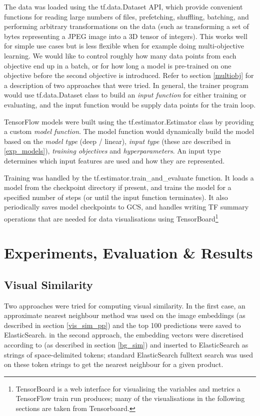 The data was loaded using the tf.data.Dataset API, which provide convenient functions for reading large numbers of files, prefetching, shuffling, batching, and performing arbitrary transformations on the data (such as transforming a set of bytes representing a JPEG image into a 3D tensor of integers).
This works well for simple use cases but is less flexible when for example doing multi-objective learning.
We would like to control roughly how many data points from each objective end up in a batch, or for how long a model is pre-trained on one objective before the second objective is introduced.
Refer to section \ref{multiobj} for a description of two approaches that were tried.
In general, the trainer program would use tf.data.Dataset class to build an \textit{input function} for either training or evaluating, and the input function would be supply data points for the train loop.

TensorFlow models were built using the tf.estimator.Estimator class by providing a custom \textit{model function}.
The model function would dynamically build the model based on the \textit{model type} (deep / linear), \textit{input type} (these are described in \ref{exp_models}), \textit{training objectives} and \textit{hyperparameters}.
An input type determines which input features are used and how they are represented.

Training was handled by the tf.estimator.train\_and\_evaluate function.
It loads a model from the checkpoint directory if present, and trains the model for a specified number of steps (or until the input function terminates).
It also periodically saves model checkpoints to GCS, and handles writing TF summary operations that are needed for data visualisations using TensorBoard\footnote{TensorBoard is a web interface for visualising the variables and metrics a TensorFlow train run produces; many of the visualisations in the following sections are taken from Tensorboard.}

\section{Experiments, Evaluation \& Results}
\label{exp}

\subsection{Visual Similarity}
\label{exp_sim}

Two approaches were tried for computing visual similarity.
In the first case, an approximate nearest neighbour method \cite{nmslib} was used on the image embeddings (as described in section \ref{vis_sim_pp}) and the top 100 predictions were saved to ElasticSearch.
in the second approach, the embedding vectors were discretised according to \cite{vec_fulltext} (as described in section \ref{bg_sim}) and inserted to ElasticSearch as strings of space-delimited tokens; standard ElasticSearch fulltext search was used on these token strings to get the nearest neighbour for a given product.

